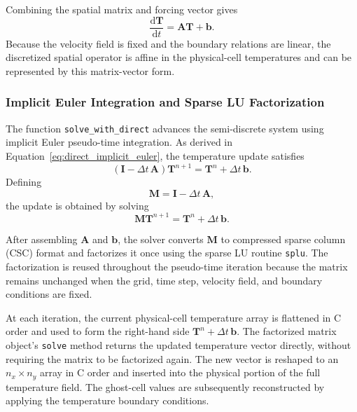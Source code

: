 Combining the spatial matrix and forcing vector gives
\begin{equation}
\frac{\mathrm{d}\mathbf{T}}{\mathrm{d}t}
=
\mathbf{A}\mathbf{T}+\mathbf{b}.
\end{equation}
Because the velocity field is fixed and the boundary
relations are linear, the discretized spatial operator is
affine in the physical-cell temperatures and can be represented
by this matrix-vector form.

\subsubsection{Implicit Euler Integration and Sparse LU Factorization}

The function \texttt{solve\_with\_direct} advances the
semi-discrete system using implicit Euler pseudo-time integration.
As derived in Equation~\eqref{eq:direct_implicit_euler},
the temperature update satisfies
\begin{equation}
\boxed{
\left(\mathbf{I}-\Delta t\,\mathbf{A}\right)
\mathbf{T}^{n+1}
=
\mathbf{T}^{n}+\Delta t\,\mathbf{b}.
}
\label{eq:direct_implementation_update}
\end{equation}
Defining
\begin{equation}
\mathbf{M}=\mathbf{I}-\Delta t\,\mathbf{A},
\label{eq:direct_implementation_matrix}
\end{equation}
the update is obtained by solving
\begin{equation}
\mathbf{M}\mathbf{T}^{n+1}
=
\mathbf{T}^{n}+\Delta t\,\mathbf{b}.
\end{equation}

After assembling $\mathbf{A}$ and $\mathbf{b}$, the solver
converts $\mathbf{M}$ to compressed sparse column (CSC)
format and factorizes it once using the sparse LU routine
\texttt{splu}. The factorization is reused throughout the
pseudo-time iteration because the matrix remains unchanged
when the grid, time step, velocity field, and boundary
conditions are fixed.

At each iteration, the current physical-cell temperature
array is flattened in C order and used to form the right-hand
side $\mathbf{T}^{n}+\Delta t\,\mathbf{b}$. The factorized
matrix object's \texttt{solve} method returns the updated
temperature vector directly, without requiring the matrix to
be factorized again. The new vector is reshaped to an
$n_x\times n_y$ array in C order and inserted into the
physical portion of the full temperature field. The ghost-cell
values are subsequently reconstructed by applying the
temperature boundary conditions.

